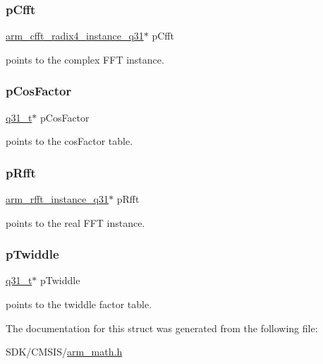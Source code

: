 \subsubsection{\texorpdfstring{p\+Cfft}{pCfft}}
{\footnotesize\ttfamily \mbox{\hyperlink{structarm__cfft__radix4__instance__q31}{arm\+\_\+cfft\+\_\+radix4\+\_\+instance\+\_\+q31}}$\ast$ p\+Cfft}

points to the complex F\+FT instance. \mbox{\label{structarm__dct4__instance__q31_af06acf18dc6547fc29aba2eb68cc63f0}} 
\subsubsection{\texorpdfstring{p\+Cos\+Factor}{pCosFactor}}
{\footnotesize\ttfamily \mbox{\hyperlink{arm__math_8h_adc89a3547f5324b7b3b95adec3806bc0}{q31\+\_\+t}}$\ast$ p\+Cos\+Factor}

points to the cos\+Factor table. \mbox{\label{structarm__dct4__instance__q31_a16c74f8496e1691e62da3c57e0c676eb}} 
\subsubsection{\texorpdfstring{p\+Rfft}{pRfft}}
{\footnotesize\ttfamily \mbox{\hyperlink{structarm__rfft__instance__q31}{arm\+\_\+rfft\+\_\+instance\+\_\+q31}}$\ast$ p\+Rfft}

points to the real F\+FT instance. \mbox{\label{structarm__dct4__instance__q31_a2505b7d5ec077b244c712797a5253b6d}} 
\subsubsection{\texorpdfstring{p\+Twiddle}{pTwiddle}}
{\footnotesize\ttfamily \mbox{\hyperlink{arm__math_8h_adc89a3547f5324b7b3b95adec3806bc0}{q31\+\_\+t}}$\ast$ p\+Twiddle}

points to the twiddle factor table. 

The documentation for this struct was generated from the following file\+:\begin{DoxyCompactItemize}
\item 
S\+D\+K/\+C\+M\+S\+I\+S/\mbox{\hyperlink{arm__math_8h}{arm\+\_\+math.\+h}}\end{DoxyCompactItemize}
